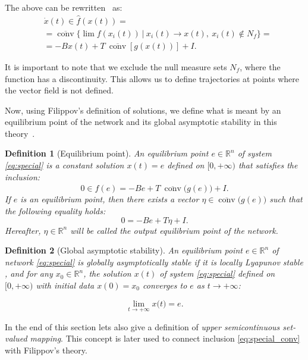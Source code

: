 \documentclass[journal]{IEEEtran}
\theoremstyle{myplain}
\newtheorem{definition}{Definition}
\begin{document}
The above can be rewritten~\cite{ShevitzPaden1994} as:
\begin{equation}\label{eq:special_conv}
\begin{aligned}
&\dot x (t)\in \hat f(x(t)) = \\
	&=\overline{\operatorname{conv}}\big\{\lim f(x_i(t)) ~|~x_i(t) \to x(t),~x_i(t)\notin N_f\big\} = \\
	&= -B x(t)+T~\overline{\operatorname{conv}}[g(x(t))]+I. 
\end{aligned}
\end{equation}

 It is important to note that we exclude the null measure sets $N_f$,
 where the function has a discontinuity.
 This allows us to define trajectories at points where
 the vector field is not defined.

Now, using Filippov's definition of solutions, we define what is meant by an equilibrium point of the network and its global asymptotic stability in this theory~\cite{p1}.


\begin{definition}[Equilibrium point]\label{equilib}
An \textit{equilibrium point} $e\in \mathbb{R}^n$ of system \eqref{eq:special} is a constant solution $x(t)=e$ defined on $[0,+\infty)$ that satisfies the inclusion:
\[      
    0 \in \hat f(e) = 
    -B e + T~\overline{\operatorname{conv}}\big(g(e)\big) + I.
\]
If $e$ is an \textit{equilibrium point}, then there exists a vector $\eta \in \overline{\operatorname{conv}}\big(g(e)\big)$ such that the following equality holds:
\[ 0 = -B e + T\eta + I \tag{a.e.}.\]
Hereafter, $\eta \in \mathbb{R}^n$ will be called the \textit{output equilibrium point} of the network.
\end{definition}

\begin{definition}[Global asymptotic stability]\label{gas_of_eq}
An equilibrium point $e \in \mathbb{R}^n$ of network \eqref{eq:special} is \textit{globally asymptotically stable} if it is locally Lyapunov stable \cite{Lyapunov}, and for any $ x_0\in \mathbb{R}^n$, the solution $x(t)$ of system \eqref{eq:special} defined on $[0,+\infty)$ with initial data $x(0)=x_0$ converges to $e$ as $t \to +\infty$:

   \[  \lim\limits_{t\to + \infty }x\big(t\big) = e.\]
\end{definition}

In the end of this section lets also give a definition of \textit{upper semicontinuous set-valued mapping}. This concept is later used to connect inclusion \eqref{eq:special_conv} with Filippov's theory. 
\end{document}
